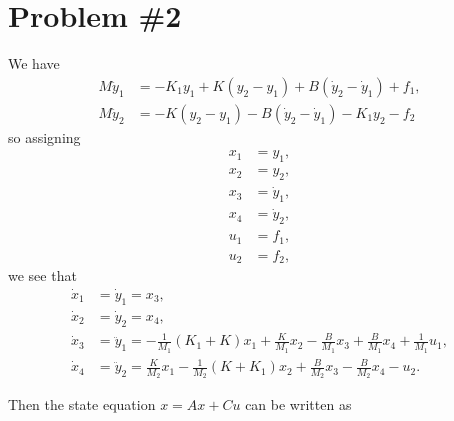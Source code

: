 \documentclass{article}
\begin{document}
\section*{Problem \#2}
We have
\begin{align*}
  M \ddot{y}_1 &= -K_1 y_1 +K (y_2 - y_1) +B (\dot{y}_2 - \dot{y}_1) + f_1 , \\
  M \ddot{y}_2 &= -K (y_2 - y_1) -B (\dot{y}_2 - \dot{y}_1) -K_1 y_2 - f_2
\end{align*}
so assigning
\begin{align*}
x_1 &= y_1 , \\
x_2 &= y_2 , \\
x_3 &= \dot{y}_1 , \\
x_4 &= \dot{y}_2 , \\
u_1 &= f_1 , \\
u_2 &= f_2 ,
\end{align*}
we see that
\begin{align*}
\dot{x}_1 &= \dot{y}_1  = x_3 , \\
\dot{x}_2 &= \dot{y}_2  = x_4 , \\
\dot{x}_3 &= \ddot{y}_1 = -\frac{1}{M_1}\left( K_1 + K \right) x_1
                        +  \frac{K}{M_1} x_2
                        -  \frac{B}{M_1} x_3
                        +  \frac{B}{M_1} x_4
                        +  \frac{1}{M_1} u_1, \\
\dot{x}_4 &= \ddot{y}_2 = \frac{K}{M_2} x_1
                        - \frac{1}{M_2} \left( K + K_1 \right) x_2
                        + \frac{B}{M_2} x_3
                        - \frac{B}{M_2} x_4 
                        - u_2.
\end{align*}

Then the state equation $x = Ax + Cu$ can be written as
\end{document}
